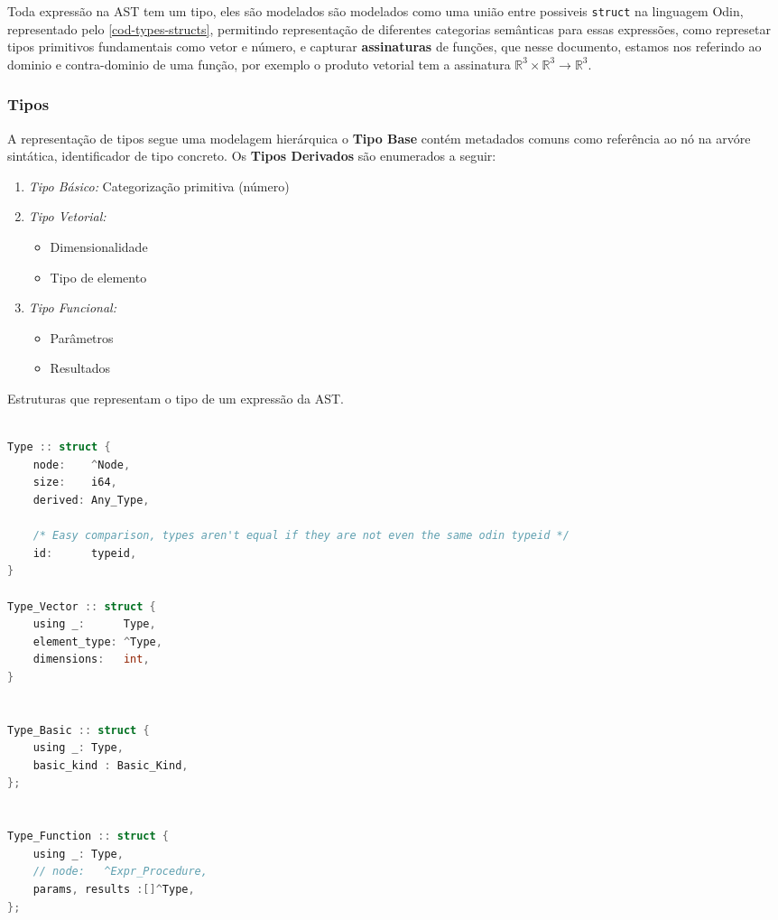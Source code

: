 Toda expressão na AST tem um tipo, eles são modelados são modelados como uma união entre possiveis \verb"struct" na linguagem Odin, representado pelo \autoref{cod-types-structs}, permitindo representação de diferentes categorias semânticas para essas expressões, como represetar tipos primitivos fundamentais como vetor e número, e capturar \textbf{assinaturas} de funções, que nesse documento, estamos nos referindo ao dominio e contra-dominio de uma função, por exemplo o produto vetorial tem a assinatura $\mathbb{R}^3\times\mathbb{R}^3 \to \mathbb{R}^3$.

\subsubsection{Tipos}
A representação de tipos segue uma modelagem hierárquica o \textbf{Tipo Base} contém metadados comuns
como referência ao nó na arvóre sintática, identificador de tipo concreto. Os \textbf{Tipos Derivados} são enumerados a seguir:

\begin{enumerate}
    \item \textit{Tipo Básico:} Categorização primitiva (número)
    \item \textit{Tipo Vetorial:}
    \begin{itemize}
        \item Dimensionalidade
        \item Tipo de elemento
    \end{itemize}
    \item \textit{Tipo Funcional:}
    \begin{itemize}
        \item Parâmetros
        \item Resultados
    \end{itemize}
\end{enumerate}

\begin{codigo}[htb]
    \caption{\small Estruturas que representam o tipo de um expressão da AST. }
    \label{cod-types-structs}
\begin{lstlisting}[language=C, numbers=none, frame=none, inputencoding=latin1]

Type :: struct {
    node:    ^Node,
    size:    i64,
    derived: Any_Type,

    /* Easy comparison, types aren't equal if they are not even the same odin typeid */
    id:      typeid,
}

Type_Vector :: struct {
    using _:      Type,
    element_type: ^Type,
    dimensions:   int,
}


Type_Basic :: struct {
    using _: Type,
    basic_kind : Basic_Kind,
};


Type_Function :: struct {
    using _: Type,
    // node:   ^Expr_Procedure,
    params, results :[]^Type,
};

\end{lstlisting}
\end{codigo}


